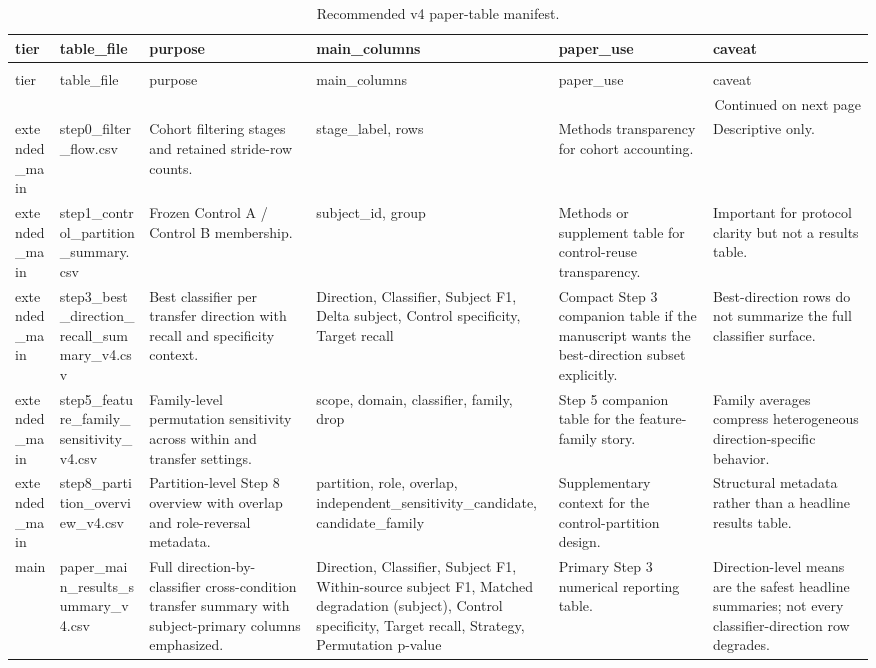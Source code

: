 \begin{longtable}{llllll}
\caption{Recommended v4 paper-table manifest.} \label{tab:paper_table_manifest_v4} \\
\toprule
tier & table_file & purpose & main_columns & paper_use & caveat \\
\midrule
\endfirsthead
\caption[]{Recommended v4 paper-table manifest.} \\
\toprule
tier & table_file & purpose & main_columns & paper_use & caveat \\
\midrule
\endhead
\midrule
\multicolumn{6}{r}{Continued on next page} \\
\midrule
\endfoot
\bottomrule
\endlastfoot
extended_main & step0_filter_flow.csv & Cohort filtering stages and retained stride-row counts. & stage_label, rows & Methods transparency for cohort accounting. & Descriptive only. \\
extended_main & step1_control_partition_summary.csv & Frozen Control A / Control B membership. & subject_id, group & Methods or supplement table for control-reuse transparency. & Important for protocol clarity but not a results table. \\
extended_main & step3_best_direction_recall_summary_v4.csv & Best classifier per transfer direction with recall and specificity context. & Direction, Classifier, Subject F1, Delta subject, Control specificity, Target recall & Compact Step 3 companion table if the manuscript wants the best-direction subset explicitly. & Best-direction rows do not summarize the full classifier surface. \\
extended_main & step5_feature_family_sensitivity_v4.csv & Family-level permutation sensitivity across within and transfer settings. & scope, domain, classifier, family, drop & Step 5 companion table for the feature-family story. & Family averages compress heterogeneous direction-specific behavior. \\
extended_main & step8_partition_overview_v4.csv & Partition-level Step 8 overview with overlap and role-reversal metadata. & partition, role, overlap, independent_sensitivity_candidate, candidate_family & Supplementary context for the control-partition design. & Structural metadata rather than a headline results table. \\
main & paper_main_results_summary_v4.csv & Full direction-by-classifier cross-condition transfer summary with subject-primary columns emphasized. & Direction, Classifier, Subject F1, Within-source subject F1, Matched degradation (subject), Control specificity, Target recall, Strategy, Permutation p-value & Primary Step 3 numerical reporting table. & Direction-level means are the safest headline summaries; not every classifier-direction row degrades. \\

\end{longtable}

